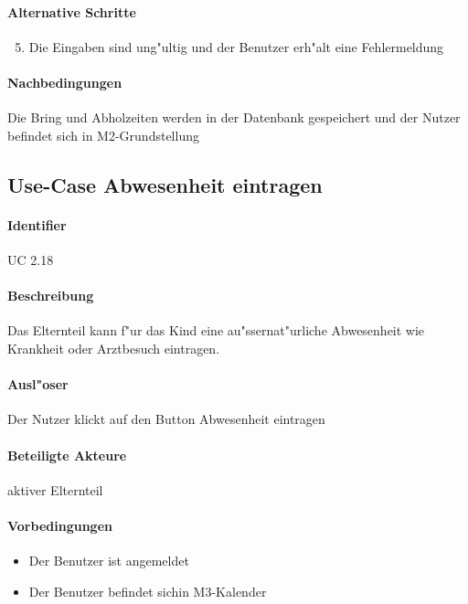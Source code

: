   \paragraph{Alternative Schritte}
  \begin{enumerate}
  \setcounter{enumi}{4}
   \item  Die Eingaben sind ung"ultig und der Benutzer erh"alt eine Fehlermeldung
  \end{enumerate}

  \paragraph{Nachbedingungen}
  Die Bring und Abholzeiten werden in der Datenbank gespeichert und der Nutzer befindet sich in M2-Grundstellung

  
  \newpage
 \subsection{Use-Case Abwesenheit eintragen}
  \paragraph{Identifier}
  UC 2.18
  \paragraph{Beschreibung}
  Das Elternteil kann f"ur das Kind eine au"ssernat"urliche Abwesenheit wie Krankheit oder Arztbesuch eintragen.
  \paragraph{Ausl"oser}
  Der Nutzer klickt auf den Button \dq Abwesenheit eintragen\dq
  \paragraph{Beteiligte Akteure}   \leavevmode \newline
    aktiver Elternteil
  \paragraph{Vorbedingungen}
  \begin{itemize}
   \item Der Benutzer ist angemeldet
   \item Der Benutzer befindet sichin M3-Kalender
  \end{itemize}

